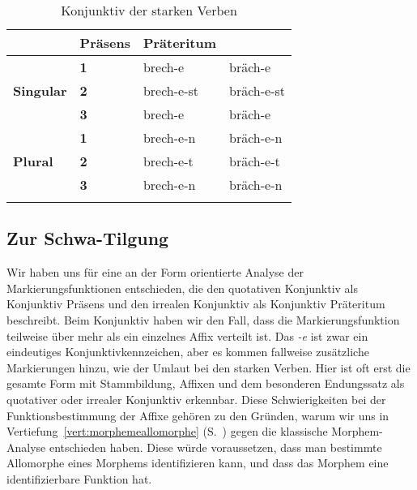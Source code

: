 \begin{table}[!htbp]
  \centering
  \begin{tabular}{llll}
    \lsptoprule
    \multicolumn{2}{c}{} & \textbf{Präsens} & \textbf{Präteritum} \\
    \midrule
    \multirow{3}{*}{\textbf{Singular}} & \textbf{1} & brech-e & bräch-e \\
    & \textbf{2} & brech-e-st & bräch-e-st \\
    & \textbf{3} & brech-e & bräch-e \\
    \midrule
    \multirow{3}{*}{\textbf{Plural}} & \textbf{1} & brech-e-n & bräch-e-n \\
    & \textbf{2} & brech-e-t & bräch-e-t \\
    & \textbf{3} & brech-e-n & bräch-e-n \\
    \lspbottomrule
  \end{tabular}
  \caption{Konjunktiv der starken Verben}
  \label{tab:konjunktiv093}
\end{table}


\subsection{Zur Schwa-Tilgung}
\label{sec:zurschwatilgung}


Wir haben uns für eine an der Form orientierte Analyse der Markierungsfunktionen entschieden, die den quotativen Konjunktiv als Konjunktiv Präsens und den irrealen Konjunktiv als Konjunktiv Präteritum beschreibt.
Beim Konjunktiv haben wir den Fall, dass die Markierungsfunktion teilweise über mehr als ein einzelnes Affix verteilt ist.
Das \textit{-e} ist zwar ein eindeutiges Konjunktivkennzeichen, aber es kommen fallweise zusätzliche Markierungen hinzu, wie \zB der Umlaut bei den starken Verben.
Hier ist oft erst die gesamte Form mit Stammbildung, Affixen und dem besonderen Endungssatz als quotativer oder irrealer Konjunktiv erkennbar.
Diese Schwierigkeiten bei der Funktionsbestimmung der Affixe gehören zu den Gründen, warum wir uns in Vertiefung~\ref{vert:morphemeallomorphe} (S.~\pageref{vert:morphemeallomorphe}) gegen die klassische Morphem-Analyse entschieden haben.
Diese würde voraussetzen, dass man bestimmte Allomorphe eines Morphems identifizieren kann, und dass das Morphem eine identifizierbare Funktion hat.

